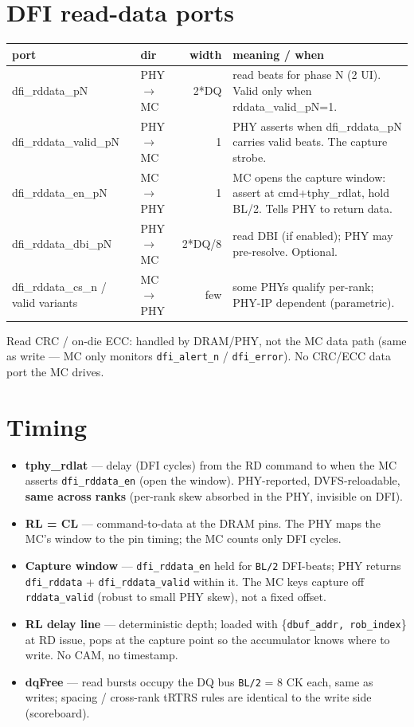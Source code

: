 \documentclass[10pt]{article}
\begin{document}
\section{DFI read-data ports}
\begin{tabular}{P W D M}
\toprule
{}\textbf{port} & \textbf{dir} & \textbf{width} & \textbf{meaning / when}\\ \midrule
dfi_rddata_pN        & PHY$\to$MC & 2*DQ & read beats for phase N (2 UI). Valid only when rddata_valid_pN=1.\\
dfi_rddata_valid_pN  & PHY$\to$MC & 1    & PHY asserts when dfi_rddata_pN carries valid beats. The capture strobe.\\
dfi_rddata_en_pN     & MC$\to$PHY & 1    & MC opens the capture window: assert at cmd+tphy_rdlat, hold BL/2. Tells PHY to return data.\\
dfi_rddata_dbi_pN    & PHY$\to$MC & 2*DQ/8 & read DBI (if enabled); PHY may pre-resolve. Optional.\\
dfi_rddata_cs_n / valid variants & MC$\to$PHY & few & some PHYs qualify per-rank; PHY-IP dependent (parametric).\\
\bottomrule
\end{tabular}

\smallskip
{\footnotesize Read CRC / on-die ECC: handled by DRAM/PHY, not the MC data path (same as write ---
MC only monitors \texttt{dfi\_alert\_n} / \texttt{dfi\_error}). No CRC/ECC data port the MC drives.}

\section{Timing}
\begin{itemize}
\item \textbf{tphy\_rdlat} --- delay (DFI cycles) from the RD command to when the MC asserts
      \texttt{dfi\_rddata\_en} (open the window). PHY-reported, DVFS-reloadable, \textbf{same across
      ranks} (per-rank skew absorbed in the PHY, invisible on DFI).
\item \textbf{RL = CL} --- command-to-data at the DRAM pins. The PHY maps the MC's window to the pin
      timing; the MC counts only DFI cycles.
\item \textbf{Capture window} --- \texttt{dfi\_rddata\_en} held for \texttt{BL/2} DFI-beats; PHY returns
      \texttt{dfi\_rddata} + \texttt{dfi\_rddata\_valid} within it. The MC keys capture off
      \texttt{rddata\_valid} (robust to small PHY skew), not a fixed offset.
\item \textbf{RL delay line} --- deterministic depth; loaded with \{\texttt{dbuf\_addr, rob\_index}\} at
      RD issue, pops at the capture point so the accumulator knows where to write. No CAM, no timestamp.
\item \textbf{dqFree} --- read bursts occupy the DQ bus \texttt{BL/2} = 8 CK each, same as writes;
      spacing / cross-rank tRTRS rules are identical to the write side (scoreboard).
\end{itemize}
\end{document}

